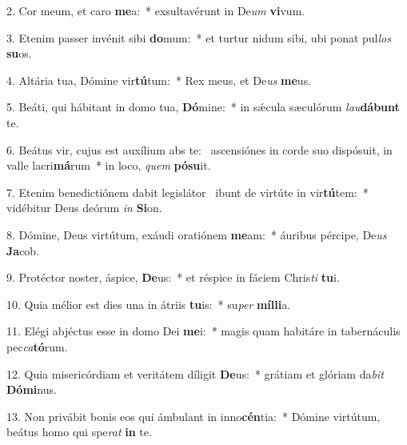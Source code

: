 2. Cor meum, et caro \textbf{me}a:~*  exsultavérunt in De\textit{um} \textbf{vi}vum.\

3. Etenim passer invénit sibi \textbf{do}mum:~*  et turtur nidum sibi, ubi ponat pul\textit{los} \textbf{su}os.\

4. Altária tua, Dómine vir\textbf{tú}tum:~*  Rex meus, et De\textit{us} \textbf{me}us.\

5. Beáti, qui hábitant in domo tua, \textbf{Dó}mine:~*  in sǽcula sæculórum \textit{lau}\textbf{dá}\textbf{bunt} te.\

6. Beátus vir, cujus est auxílium abs te: \dag\  ascensiónes in corde suo dispósuit, in valle lacri\textbf{má}rum~*  in loco, \textit{quem} \textbf{pó}\textbf{su}it.\

7. Etenim benedictiónem dabit legislátor \dag\  ibunt de virtúte in vir\textbf{tú}tem:~*  vidébitur Deus deórum \textit{in} \textbf{Si}on.\

8. Dómine, Deus virtútum, exáudi oratiónem \textbf{me}am:~*  áuribus pércipe, De\textit{us} \textbf{Ja}cob.\

9. Protéctor noster, áspice, \textbf{De}us:~*  et réspice in fáciem Chris\textit{ti} \textbf{tu}i.\

10. Quia mélior est dies una in átriis \textbf{tu}is:~*  su\textit{per} \textbf{míl}\textbf{li}a.\

11. Elégi abjéctus esse in domo Dei \textbf{me}i:~*  magis quam habitáre in tabernáculis pec\textit{ca}\textbf{tó}rum.\

12. Quia misericórdiam et veritátem díligit \textbf{De}us:~*  grátiam et glóriam da\textit{bit} \textbf{Dó}\textbf{mi}nus.\

13. Non privábit bonis eos qui ámbulant in inno\textbf{cén}tia:~*  Dómine virtútum, beátus homo qui spe\textit{rat} \textbf{in} te.\

